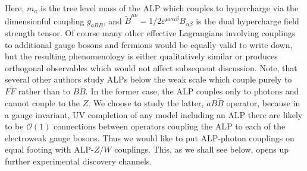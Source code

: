 \documentclass[aps,onecolumn,twoside,secnumarabic,12pt,balancelastpage,amsmath,amssymb,nofootinbib,hyperref=pdftex]{revtex4}
\begin{document}
Here, $m_{a}$ is the tree level mass of the ALP which couples to hypercharge via the dimensionful coupling $g_{a BB}$, and $\tilde{B}^{\mu\nu} = 1/2\varepsilon^{\mu\nu\alpha\beta}B_{\alpha\beta}$ is the dual hypercharge field strength tensor. Of course many other effective Lagrangians involving couplings to additional gauge bosons and fermions would be equally valid to write down, but the resulting phenomenology is either qualitatively similar or produces orthogonal observables which would not affect subsequent discussion. Note, that several other authors study ALPs below the weak scale which couple purely to $F\tilde{F}$ rather than to $B\tilde{B}$. In the former case, the ALP couples only to photons and cannot couple to the $Z$. We choose to study the latter, $aB\tilde{B}$ operator, because in a gauge invariant, UV completion of any model including an ALP there are likely to be $\mathcal{O}(1)$ connections between operators coupling the ALP to each of the electroweak gauge bosons. Thus we would like to put ALP-photon couplings on equal footing with ALP-$Z/W$ couplings. This, as we shall see below, opens up further experimental discovery channels.
\end{document}
